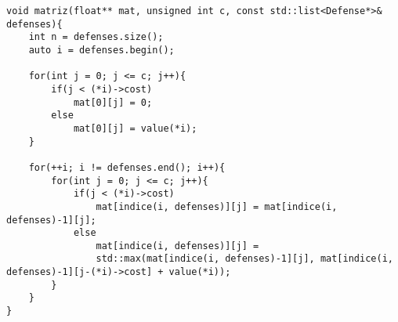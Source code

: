 \begin{lstlisting}
void matriz(float** mat, unsigned int c, const std::list<Defense*>& defenses){
    int n = defenses.size();
    auto i = defenses.begin();

    for(int j = 0; j <= c; j++){
        if(j < (*i)->cost)
            mat[0][j] = 0;
        else
            mat[0][j] = value(*i);
    }

    for(++i; i != defenses.end(); i++){
        for(int j = 0; j <= c; j++){
            if(j < (*i)->cost)
                mat[indice(i, defenses)][j] = mat[indice(i, defenses)-1][j];
            else
                mat[indice(i, defenses)][j] = 
                std::max(mat[indice(i, defenses)-1][j], mat[indice(i, defenses)-1][j-(*i)->cost] + value(*i));
        }
    }
}
\end{lstlisting}
